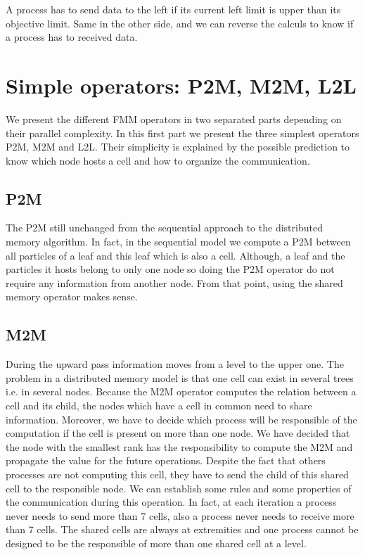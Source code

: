 \documentclass[12pt,letterpaper,titlepage]{report}
\begin{document}
A process has to send data to the left if its current left limit is upper than its objective limit.
Same in the other side, and we can reverse the calculs to know if a process has to received data.

\chapter{Simple operators: P2M, M2M, L2L}
We present the different FMM operators in two separated parts depending on their parallel complexity.
In this first part we present the three simplest operators P2M, M2M and L2L.
Their simplicity is explained by the possible prediction to know which node hosts a cell and how to organize the communication.

\section{P2M}
The P2M still unchanged from the sequential approach to the distributed memory algorithm.
In fact, in the sequential model we compute a P2M between all particles of a leaf and this leaf which is also a cell.
Although, a leaf and the particles it hosts belong to only one node so doing the P2M operator do not require any information from another node.
From that point, using the shared memory operator makes sense.

\section{M2M}
During the upward pass information moves from a level to the upper one.
The problem in a distributed memory model is that one cell can exist in several trees i.e. in several nodes.
Because the M2M operator computes the relation between a cell and its child, the nodes which have a cell in common need to share information.
Moreover, we have to decide which process will be responsible of the computation if the cell is present on more than one node.
We have decided that the node with the smallest rank has the responsibility to compute the M2M and propagate the value for the future operations.
Despite the fact that others processes are not computing this cell, they have to send the child of this shared cell to the responsible node.
We can establish some rules and some properties of the communication during this operation.
In fact, at each iteration a process never needs to send more than 7 cells, also a process never needs to receive more than 7 cells.
The shared cells are always at extremities and one process cannot be designed to be the responsible of more than one shared cell at a level.
\end{document}
